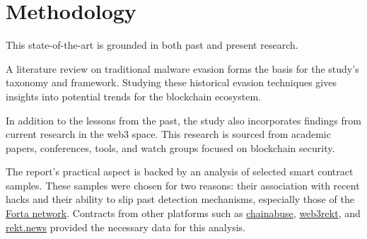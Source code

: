 \section{Methodology} \label{sec:methodology}

This state-of-the-art is grounded in both past and present research.

A literature review on traditional malware evasion forms the basis for the study's taxonomy and framework.
Studying these historical evasion techniques gives insights into potential trends for the blockchain ecosystem.

In addition to the lessons from the past, the study also incorporates findings from current research in the web3 space.
This research is sourced from academic papers, conferences, tools, and watch groups focused on blockchain security.

The report's practical aspect is backed by an analysis of selected smart contract samples.
These samples were chosen for two reasons: their association with recent hacks and their ability to slip past detection mechanisms, especially those of the \href{https://explorer.forta.network/}{Forta network}.
Contracts from other platforms such as \href{https://www.chainabuse.com/reports}{chainabuse}, \href{https://www.web3rekt.com/}{web3rekt}, and \href{https://www.rekt.news/}{rekt.news} provided the necessary data for this analysis.
